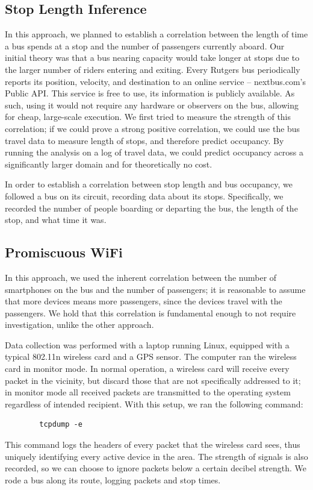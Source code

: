\documentclass[11pt,journal,compsoc]{IEEEtran} %
\begin{document}
\subsection*{Stop Length Inference}

	In this approach, we planned to establish a correlation between the length of time a bus spends at a stop and the number of passengers currently aboard.
Our initial theory was that a bus nearing capacity would take longer at stops due to the larger number of riders entering and exiting.
	Every Rutgers bus periodically reports its position, velocity, and destination to an online service -- nextbus.com's Public API.
	This service is free to use, its information is publicly available. %
    As such, using it would not require any hardware or observers on the bus, allowing for cheap, large-scale execution.
	We first tried to measure the strength of this correlation; if we could prove a strong positive correlation, we could use the bus travel data to measure length of stops, and therefore predict occupancy.
	By running the analysis on a log of travel data, we could predict occupancy across a significantly larger domain and for theoretically no cost.

	In order to establish a correlation between stop length and bus occupancy, we followed a bus on its circuit, recording data about its stops. Specifically, we recorded the number of people boarding or departing the bus, the length of the stop, and what time it was.

\subsection*{Promiscuous WiFi}

	In this approach, we used the inherent correlation between the number of smartphones on the bus and the number of passengers; it is reasonable to assume that more devices means more passengers, since the devices travel with the passengers.
	We hold that this correlation is fundamental enough to not require investigation, unlike the other approach.

    Data collection was performed with a laptop running Linux, equipped with a typical 802.11n wireless card and a GPS sensor.
	The computer ran the wireless card in monitor mode.
	In normal operation, a wireless card will receive every packet in the vicinity, but discard those that are not specifically addressed to it; in monitor mode all received packets are transmitted to the operating system regardless of intended recipient. With this setup, we ran the following command:
	\begin{verbatim}
		tcpdump -e
	\end{verbatim}
	This command logs the headers of every packet that the wireless card sees, thus uniquely identifying every active device in the area.
	The strength of signals is also recorded, so we can choose to ignore packets below a certain decibel strength.
	We rode a bus along its route, logging packets and stop times. %
\end{document}
